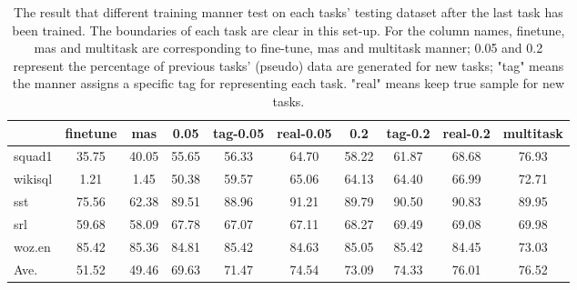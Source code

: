 \begin{table}[]
\centering
    \begin{tabular}{lccccccccc}
    \toprule
    {} &  finetune &   mas &  0.05 &  tag-0.05 &  real-0.05 &   0.2 &  tag-0.2 &  real-0.2 &  multitask \\
    \midrule
    squad1  &     35.75 & 40.05 & 55.65 &     56.33 &      64.70 & 58.22 &    61.87 &     68.68 &      76.93 \\
    wikisql &      1.21 &  1.45 & 50.38 &     59.57 &      65.06 & 64.13 &    64.40 &     66.99 &      72.71 \\
    sst     &     75.56 & 62.38 & 89.51 &     88.96 &      91.21 & 89.79 &    90.50 &     90.83 &      89.95 \\
    srl     &     59.68 & 58.09 & 67.78 &     67.07 &      67.11 & 68.27 &    69.49 &     69.08 &      69.98 \\
    woz.en  &     85.42 & 85.36 & 84.81 &     85.42 &      84.63 & 85.05 &    85.42 &     84.45 &      73.03 \\
    Ave.    &     51.52 & 49.46 & 69.63 &     71.47 &      74.54 & 73.09 &    74.33 &     76.01 &      76.52 \\
    \bottomrule
    \end{tabular}
    \caption{The result that different training manner test on each tasks' testing dataset after the last task has been trained. The boundaries of each task are clear in this set-up. For the column names, finetune, mas and multitask are corresponding to fine-tune, mas and multitask manner; 0.05 and 0.2 represent the percentage of previous tasks' (pseudo) data are generated for new tasks; "tag" means the manner assigns a specific tag for representing each task. "real" means keep true sample for new tasks.}
\label{tab:bound-model-to-tasks}
\end{table}

